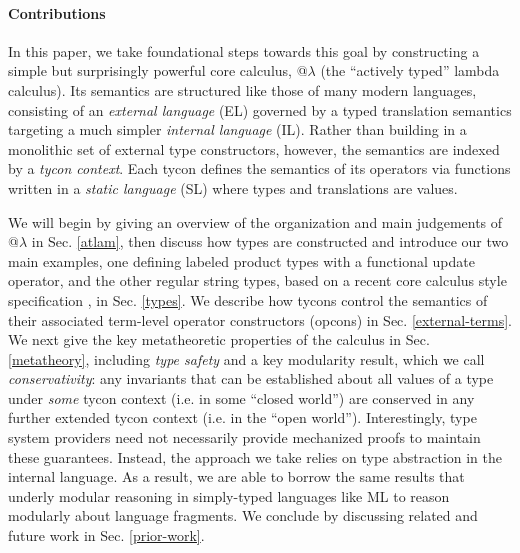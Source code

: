 \documentclass[10pt,preprint]{sigplanconf}
\begin{document}
\paragraph{Contributions} In this paper, we take foundational steps towards this goal by  constructing a simple but surprisingly powerful core calculus, @$\lambda$ (the ``actively typed'' lambda calculus). %
Its semantics are structured like those of many modern languages, consisting of an \emph{external language} (EL) governed by a {typed translation semantics} targeting a much simpler \emph{internal language} (IL). 
Rather than building in a monolithic set of external type constructors, however, the  semantics are indexed by a \emph{tycon context}. Each tycon defines the semantics of its operators via functions written in a \emph{static language} (SL) where types and translations are values. %

We will begin by giving an overview of the organization  and main judgements of @$\lambda$ in Sec. \ref{atlam}, then discuss how types are constructed and introduce our two main examples, one defining labeled product types with a functional update operator, and the other regular string types, based on a recent core calculus style specification \cite{sanitation-psp14}, in Sec. \ref{types}. We describe how tycons control the semantics of their associated term-level operator constructors (opcons) in Sec. \ref{external-terms}.  We next give the key metatheoretic properties of the calculus in Sec. \ref{metatheory}, including \emph{type safety} and a key modularity result, which we call  \emph{conservativity}: any invariants that can be established about all values of a type under \emph{some} tycon context (i.e. in some  ``closed world'') are conserved in any further extended tycon context (i.e. in the ``open world''). Interestingly, type system providers need not necessarily provide mechanized proofs to maintain these guarantees. Instead, the approach we take relies on type abstraction in the internal language. As a result, we are able to borrow the same results that underly modular reasoning in simply-typed languages like ML to reason modularly about language fragments. We conclude by discussing  related and future work in Sec. \ref{prior-work}.
\end{document}
